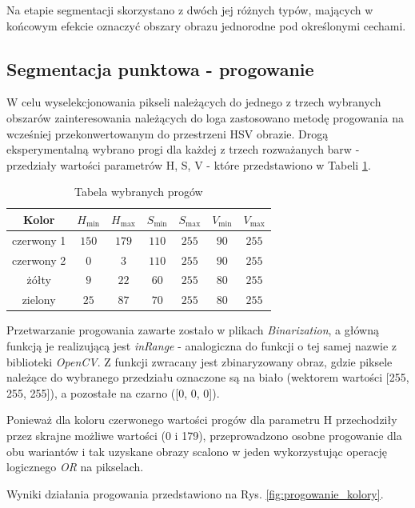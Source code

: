 Na etapie segmentacji skorzystano z dwóch jej różnych typów, mających w końcowym efekcie oznaczyć obszary obrazu jednorodne pod określonymi cechami.

\subsection{Segmentacja punktowa - progowanie}
W celu wyselekcjonowania pikseli należących do jednego z trzech wybranych obszarów zainteresowania należących do loga zastosowano metodę progowania na wcześniej przekonwertowanym do przestrzeni HSV obrazie. 
Drogą eksperymentalną wybrano progi dla każdej z trzech rozważanych barw - przedziały wartości parametrów H, S, V - które przedstawiono w Tabeli \ref{tab:progi}.

\begin{table}[h]
\centering
\begin{tabular}{c|c|c|c|c|c|c}
    Kolor & $H_{\mathrm{min}}$ & $H_{\mathrm{max}}$ & $S_{\mathrm{min}}$ & $S_{\mathrm{max}}$ & $V_{\mathrm{min}}$ & $V_{\mathrm{max}}$ \\ \hline 
    czerwony 1 & $ 150 $ & $179$ & $110$ & $255$ & $90$ & $255$ \\ \hline
    czerwony 2 & $0$ & $3$ & $110$ & $255$ & $90$ & $255$ \\ \hline
    żółty & $9$ & $22$ & $60$ & $255$ & $80$ & $255$ \\ \hline
    zielony & $25$ & $87$ & $70$ & $255$ & $80$ & $255$\\
\end{tabular}
\caption{Tabela wybranych progów}
\label{tab:progi}
\end{table}

Przetwarzanie progowania zawarte zostało w plikach \emph{Binarization}, a główną funkcją je realizującą jest \emph{inRange} - analogiczna do funkcji o tej samej nazwie z biblioteki \emph{OpenCV}. Z funkcji zwracany jest zbinaryzowany obraz, gdzie piksele należące do wybranego przedziału oznaczone są na biało (wektorem wartości [255, 255, 255]), a pozostałe na czarno ([0, 0, 0]).

Ponieważ dla koloru czerwonego wartości progów dla parametru H przechodziły przez skrajne możliwe wartości (0 i 179), przeprowadzono osobne progowanie dla obu wariantów i tak uzyskane obrazy scalono w jeden wykorzystując operację logicznego \emph{OR} na pikselach.

Wyniki działania progowania przedstawiono na Rys. \ref{fig:progowanie_kolory}. 

